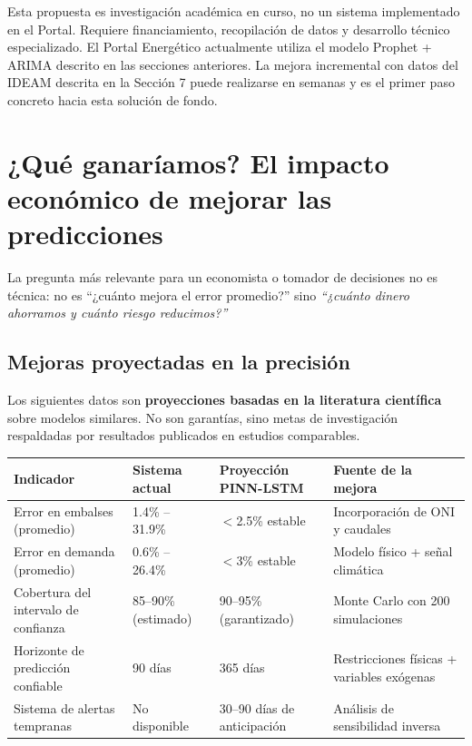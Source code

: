 \documentclass[11pt,a4paper]{article}
\begin{document}
\begin{alertbox}
Esta propuesta es investigación académica en curso, no un sistema implementado en el Portal. Requiere financiamiento, recopilación de datos y desarrollo técnico especializado. El Portal Energético actualmente utiliza el modelo Prophet + ARIMA descrito en las secciones anteriores. La mejora incremental con datos del IDEAM descrita en la Sección 7 puede realizarse en semanas y es el primer paso concreto hacia esta solución de fondo.
\end{alertbox}

\section{¿Qué ganaríamos? El impacto económico de mejorar las predicciones}

La pregunta más relevante para un economista o tomador de decisiones no es técnica: no es ``¿cuánto mejora el error promedio?'' sino \textit{``¿cuánto dinero ahorramos y cuánto riesgo reducimos?''}

\subsection{Mejoras proyectadas en la precisión}

Los siguientes datos son \textbf{proyecciones basadas en la literatura científica} sobre modelos similares. No son garantías, sino metas de investigación respaldadas por resultados publicados en estudios comparables.

\begin{center}
\small
\begin{tabular}{@{}p{4cm}p{3.5cm}p{4cm}p{3cm}@{}}
\toprule
\textbf{Indicador} & \textbf{Sistema actual} & \textbf{Proyección PINN-LSTM} & \textbf{Fuente de la mejora} \\
\midrule
Error en embalses (promedio) & 1.4\% -- 31.9\% & $<$2.5\% estable & Incorporación de ONI y caudales \\
\addlinespace
Error en demanda (promedio) & 0.6\% -- 26.4\% & $<$3\% estable & Modelo físico + señal climática \\
\addlinespace
Cobertura del intervalo de confianza & 85--90\% (estimado) & 90--95\% (garantizado) & Monte Carlo con 200 simulaciones \\
\addlinespace
Horizonte de predicción confiable & 90 días & 365 días & Restricciones físicas + variables exógenas \\
\addlinespace
Sistema de alertas tempranas & No disponible & 30--90 días de anticipación & Análisis de sensibilidad inversa \\
\bottomrule
\end{tabular}
\end{center}
\end{document}

